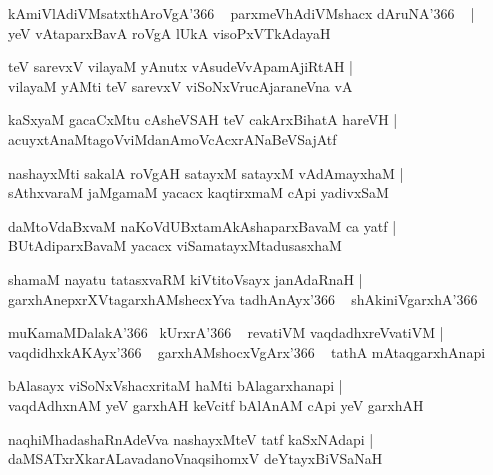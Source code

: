 \documentclass[twoside,12pt,openright]{book}
\newcounter{shloka}[chapter]
\begin{document}
\begin{shloka}%
kAmiVlAdiVMsatxthAroVgA\char'366 ~ parxmeVhAdiVMshacx dAruNA\char'366 ~ |\\
yeV vAtaparxBavA roVgA lUkA visoPxVTkAdayaH
\end{shloka}

\begin{shloka}%
teV sarevxV vilayaM yAnutx vAsudeVvApamAjiRtAH |\\
vilayaM yAMti teV sarevxV viSoNxVrucAjaraneVna vA 
\end{shloka}

\begin{shloka}%
kaSxyaM gacaCxMtu cAsheVSAH teV cakArxBihatA hareVH |\\
acuyxtAnaMtagoVviMdanAmoVcAcxrANaBeVSajAtf
\end{shloka}

\begin{shloka}%
nashayxMti sakalA roVgAH satayxM satayxM vAdAmayxhaM |\\
sAthxvaraM jaMgamaM yacacx kaqtirxmaM cApi yadivxSaM 
\end{shloka}

\begin{shloka}%
daMtoVdaBxvaM naKoVdUBxtamAkAshaparxBavaM ca yatf |\\
BUtAdiparxBavaM yacacx viSamatayxMtadusasxhaM 
\end{shloka}

\begin{shloka}%
shamaM nayatu tatasxvaRM kiVtitoVsayx janAdaRnaH |\\
garxhAnepxrXVtagarxhAMshecxYva tadhAnAyx\char'366 ~ shAkiniVgarxhA\char'366
\end{shloka}

\begin{shloka}%
muKamaMDalakA\char'366 ~kUrxrA\char'366 ~ revatiVM vaqdadhxreVvatiVM |\\
vaqdidhxkAKAyx\char'366 ~ garxhAMshocxVgArx\char'366 ~ tathA mAtaqgarxhAnapi
\end{shloka}

\begin{shloka}%
bAlasayx viSoNxVshacxritaM haMti bAlagarxhanapi |\\
vaqdAdhxnAM yeV garxhAH keVcitf bAlAnAM cApi yeV garxhAH 
\end{shloka}

\begin{shloka}%
naqhiMhadashaRnAdeVva nashayxMteV tatf kaSxNAdapi |\\
daMSATxrXkarALavadanoVnaqsihomxV deYtayxBiVSaNaH 
\end{shloka}
\end{document}
